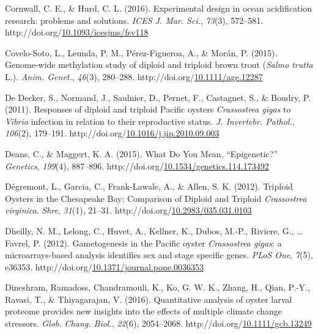 \documentclass [11pt, proquest] {uwthesis}[2015/03/03]
\newlength{\cslhangindent}
\newenvironment{CSLReferences}%
{\setlength{\parindent}{0pt}%
\everypar{\setlength{\hangindent}{\cslhangindent}}\ignorespaces}%
{\par}
\begin{document}
\begin{CSLReferences}{1}{0}
\leavevmode\hypertarget{ref-Cornwall2016}{}%
Cornwall, C. E., \& Hurd, C. L. (2016). {Experimental design in ocean acidification research: problems and solutions}. \emph{ICES J. Mar. Sci.}, \emph{73}(3), 572--581. http://doi.org/\href{https://doi.org/10.1093/icesjms/fsv118}{10.1093/icesjms/fsv118}

\leavevmode\hypertarget{ref-Covelo-Soto2015}{}%
Covelo-Soto, L., Leunda, P. M., Pérez-Figueroa, A., \& Morán, P. (2015). {Genome-wide methylation study of diploid and triploid brown trout (\emph{Salmo trutta} L.)}. \emph{Anim. Genet.}, \emph{46}(3), 280--288. http://doi.org/\href{https://doi.org/10.1111/age.12287}{10.1111/age.12287}

\leavevmode\hypertarget{ref-DeDecker2011}{}%
De Decker, S., Normand, J., Saulnier, D., Pernet, F., Castagnet, S., \& Boudry, P. (2011). {Responses of diploid and triploid Pacific oysters \emph{Crassostrea gigas} to \emph{Vibrio} infection in relation to their reproductive status}. \emph{J. Invertebr. Pathol.}, \emph{106}(2), 179--191. http://doi.org/\href{https://doi.org/10.1016/j.jip.2010.09.003}{10.1016/j.jip.2010.09.003}

\leavevmode\hypertarget{ref-Deans2015}{}%
Deans, C., \& Maggert, K. A. (2015). {What Do You Mean, {``Epigenetic?''}} \emph{Genetics}, \emph{199}(4), 887--896. http://doi.org/\href{https://doi.org/10.1534/genetics.114.173492}{10.1534/genetics.114.173492}

\leavevmode\hypertarget{ref-Degremont2012}{}%
Dégremont, L., Garcia, C., Frank-Lawale, A., \& Allen, S. K. (2012). {Triploid Oysters in the Chesapeake Bay: Comparison of Diploid and Triploid \emph{Crassostrea virginica}}. \emph{Shre}, \emph{31}(1), 21--31. http://doi.org/\href{https://doi.org/10.2983/035.031.0103}{10.2983/035.031.0103}

\leavevmode\hypertarget{ref-Dheilly2012}{}%
Dheilly, N. M., Lelong, C., Huvet, A., Kellner, K., Dubos, M.-P., Riviere, G., \ldots{} Favrel, P. (2012). {Gametogenesis in the Pacific oyster \emph{Crassostrea gigas}: a microarrays-based analysis identifies sex and stage specific genes}. \emph{PLoS One}, \emph{7}(5), e36353. http://doi.org/\href{https://doi.org/10.1371/journal.pone.0036353}{10.1371/journal.pone.0036353}

\leavevmode\hypertarget{ref-Dineshram2016}{}%
Dineshram, Ramadoss, Chandramouli, K., Ko, G. W. K., Zhang, H., Qian, P.-Y., Ravasi, T., \& Thiyagarajan, V. (2016). {Quantitative analysis of oyster larval proteome provides new insights into the effects of multiple climate change stressors}. \emph{Glob. Chang. Biol.}, \emph{22}(6), 2054--2068. http://doi.org/\href{https://doi.org/10.1111/gcb.13249}{10.1111/gcb.13249}


\end{CSLReferences}
\end{document}
